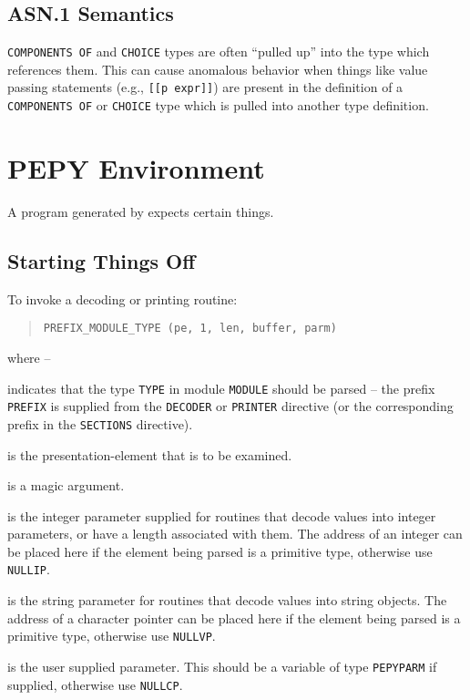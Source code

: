 \subsection	{ASN.1 Semantics}
\verb"COMPONENTS OF" and \verb"CHOICE" types are often ``pulled up'' into the
type which references them.
This can cause anomalous behavior when things like value passing statements
(e.g., \verb"[[p expr]]")
are present in the definition of a \verb"COMPONENTS OF" or \verb"CHOICE" type
which is pulled into another type definition.

\section	{PEPY Environment}
A program generated by  expects certain things.

\subsection	{Starting Things Off}
To invoke a decoding or printing routine:
\begin{quote}\small\begin{verbatim}
PREFIX_MODULE_TYPE (pe, 1, len, buffer, parm)
\end{verbatim}\end{quote}
where --
\begin{describe}
\item[\verb"PREFIX\_MODULE\_TYPE":] indicates that the type
\verb"TYPE" in module
\verb"MODULE" should be parsed -- the prefix \verb"PREFIX" is supplied from
the \verb"DECODER" or \verb"PRINTER" directive
(or the corresponding prefix in the \verb"SECTIONS" directive).

\item[\verb"pe":] is the presentation-element that is to be examined.

\item[\verb"1":] is a magic argument.

\item[\verb"len":] is the integer parameter supplied for routines that
decode values into integer parameters, or have a length associated
with them. The address of an integer can be placed here if the element
being parsed is a primitive type, otherwise use \verb"NULLIP".

\item[\verb"buffer":] is the string parameter for routines that decode
values into string objects. The address of a character pointer can be placed
here if the element being parsed is a primitive type, otherwise use
\verb"NULLVP".

\item[\verb"parm":] is the user supplied parameter. This should be a variable
of type \verb"PEPYPARM" if supplied,
otherwise use \verb"NULLCP".
\end{describe}


